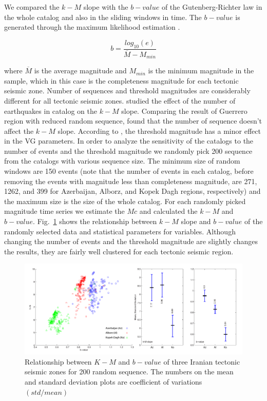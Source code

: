 \noindent
We compared the $k-M$ slope with the $b-value$ of the Gutenberg-Richter law in the whole catalog and also in the sliding windows in time. The $b-value$ is generated through the maximum likelihood estimation \citep{Aki1965}.

\begin{equation}
b = \frac{log_{10}(e) }{\overline{M} - M_{min}}  
\end{equation}
 
 \noindent
 where $\overline{M}$ is the average magnitude and $M_{min}$ is the minimum magnitude in the sample, which in this case is the completeness magnitude for each tectonic seismic zone. Number of sequences and threshold magnitudes are considerably different for all tectonic seismic zones. \citet{Telesca2013} studied the effect of the number of earthquakes in catalog on the $k-M$ slope. Comparing the result of Guerrero region with reduced random sequence, \citet{Telesca2013} found that the number of sequence doesn't affect the $k-M$ slope.  According to \citet{Telesca2012}, the threshold magnitude has a minor effect in the VG parameters. In order to analyze the sensitivity of the catalogs to the number of events and the threshold magnitude we randomly pick 200 sequence from the catalogs with various sequence size. The minimum size of random windows are 150 events (note that the number of events in each catalog, before removing the events with magnitude less than completeness magnitude, are 271, 1262, and 399 for Azerbaijan, Alborz, and Kopek Dagh regions, respectively) and the maximum size is the size of the whole catalog. For each randomly picked magnitude time series we estimate the $Mc$ and calculated the $k-M$ and $b-value$. Fig.~\ref{fig:random} shows the relationship between $k-M$ slope and $b-value$ of the randomly selected data and statistical parameters for variables. Although changing the number of events and the threshold magnitude are slightly changes the results, they are fairly well clustered for each tectonic seismic region. 
 
 \begin{figure} [ht]
\centering
\includegraphics[scale=0.4]{figures/pdf/Figure06.pdf} 
\caption{ Relationship between $K-M$ and $b-value$ of three Iranian tectonic seismic zones for 200 random sequence. The numbers on the mean and standard deviation plots are coefficient of variations $(std/mean)$}
\label{fig:random}
\end{figure}
 
